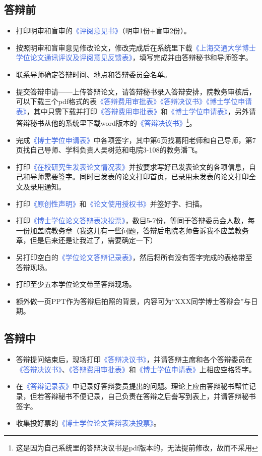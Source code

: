 \documentclass[a4paper, 12pt]{ctexart}
\newcommand{\form}[1]{\textcolor{RoyalBlue}{《#1》}}
\begin{document}
\hypertarget{dbq}{\subsection{答辩前}}
\begin{itemize}
    \item 打印明审和盲审的\form{评阅意见书}（明审1份+盲审2份）。
    \item 按照明审和盲审意见修改论文，修改完成后在系统里下载\form{上海交通大学博士学位论文通讯评议及评阅意见反馈表}，填写完成并由答辩秘书和导师签字。
    \item 联系导师确定答辩时间、地点和答辩委员会名单。
    \item 提交答辩申请——上传答辩论文，请答辩秘书录入答辩安排，院教务审核后，可以下载三个pdf格式的表\form{答辩费用审批表}\form{答辩决议书}\form{博士学位申请表}，其中只需下载并打印\form{答辩费用审批表}和\form{博士学位申请表}，另外请答辩秘书从他的系统里下载word版本的\form{答辩决议书}\footnote{这是因为自己系统里的答辩决议书是pdf版本的，无法提前修改，故而不采用}。
    \item 完成\form{博士学位申请表}中各项签字，其中第6页找葛阳老师和自己导师，第7页找自己导师、学科负责人吴树范和电院3-108的教务潘飞。
    \item 打印\form{在校研究生发表论文情况表}并按要求写好已发表论文的各项信息，自己和导师需要签字。同时已发表的论文打印首页，已录用未发表的论文打印全文及录用通知。
    \item 打印\form{原创性声明}和\form{论文使用授权书}并签好字、扫描。
    \item 打印\form{博士学位论文答辩表决投票}，数目5-7份，等同于答辩委员会人数，每一份加盖院教务章（我这儿有一些问题，答辩后电院老师告诉我不应盖教务章，但是后来还是让我过了，需要确定一下）
    \item 另打印空白的\form{学位论文答辩记录表}，然后将所有没有签字完成的表格带至答辩现场。
    \item 打印至少五本学位论文带至答辩现场。
    \item 额外做一页PPT作为答辩后拍照的背景，内容可为“XXX同学博士答辩会”与日期。
    
\end{itemize}
\hypertarget{dbz}{\subsection{答辩中}}
\begin{itemize}
    \item 答辩提问结束后，现场打印\form{答辩决议书}，并请答辩主席和各个答辩委员在\form{答辩决议书}、\form{答辩费用审批表}和\form{博士学位申请表}上相应空格签字。
    \item 在\form{答辩记录表}中记录好答辩委员提出的问题。理论上应由答辩秘书帮忙记录，但若答辩秘书不便记录，自己负责在答辩之后誊写到表上，并请答辩秘书签字。
    \item 收集投好票的\form{博士学位论文答辩表决投票}。
\end{itemize}
\end{document}
